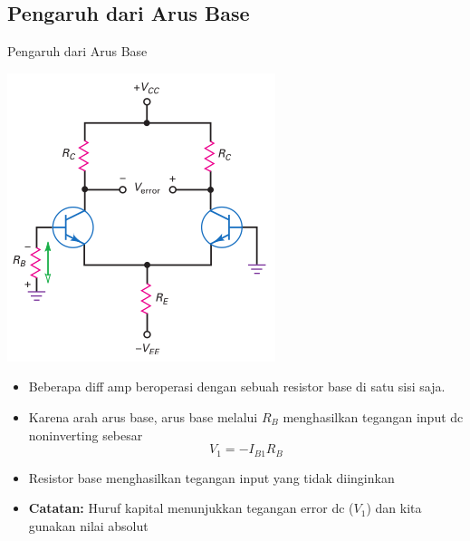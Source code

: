 \documentclass[aspectratio=169]{beamer}
\begin{document}
\subsection{Pengaruh dari Arus Base}
\begin{frame}{Pengaruh dari Arus Base}
	\begin{multicols}{2}
		\begin{center}
			\includegraphics[height=0.7\textheight]{gambar/01.base_resistor_produces_unwanted_input_voltage}
		\end{center}
		\begin{itemize}
			\item Beberapa diff amp beroperasi dengan sebuah resistor base di satu sisi saja.
			\item Karena arah arus base, arus base melalui $ R_B $ menghasilkan tegangan input dc noninverting sebesar
			\[ V_1 = -I_{B1}R_B \]
			\item Resistor base menghasilkan tegangan input yang tidak diinginkan
			\item \textbf{Catatan:} Huruf kapital menunjukkan tegangan error dc ($ V_1 $) dan kita gunakan nilai absolut
		\end{itemize}
	\end{multicols}
\end{frame}
\end{document}

